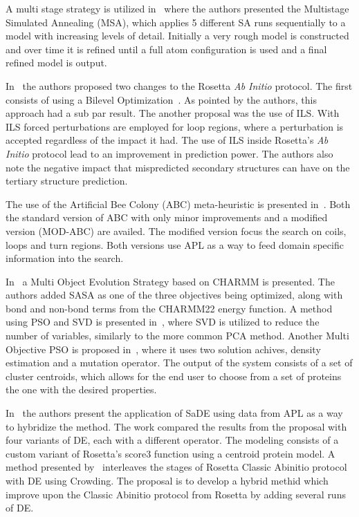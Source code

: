 A multi stage strategy is utilized in~\cite{silva2018multistage} where the authors
presented the Multistage Simulated Annealing (MSA), which applies 5 different
SA runs sequentially to a model with increasing levels of detail. Initially a
very rough model is constructed and over time it is refined until a full atom
configuration is used and a final refined model is output.

In~\cite{kandathil2018improved} the authors proposed two changes to the Rosetta
\textit{Ab Initio} protocol. The first consists of using a Bilevel
Optimization~\cite{sinha2018review}. As pointed by the authors, this approach had
a sub par result. The another proposal was the use of \ac{ILS}. With ILS forced
perturbations are employed for loop regions, where a perturbation is accepted
regardless of the impact it had. The use of \ac{ILS} inside Rosetta's
\textit{Ab Initio} protocol lead to an improvement in prediction power.
The authors also note the negative impact that mispredicted secondary structures
can have on the tertiary structure prediction.

The use of the Artificial Bee Colony (ABC) meta-heuristic is presented
in~\cite{correa2018knowledge}. Both the standard version of ABC with only
minor improvements and a modified version (MOD-ABC) are availed.
The modified version focus the search on coils, loops and turn regions. Both versions
use \ac{APL} as a way to feed domain specific information into the search.

In~\cite{gao2018incorporation} a Multi Object Evolution Strategy based on
CHARMM is presented. The authors added \ac{SASA} as one of the three objectives
being optimized, along with bond and non-bond terms from the CHARMM22 energy
function. A method using \ac{PSO} and \ac{SVD} is presented in~\cite{alvarez2018protein},
where \ac{SVD} is utilized to reduce the number of variables, similarly to the
more common \ac{PCA} method. Another Multi Objective \ac{PSO} is proposed
in~\cite{song2018adoption}, where it uses two solution achives, density estimation
and a mutation operator. The output of the system consists of a set of cluster
centroids, which allows for the end user to choose from a set of proteins the
one with the desired properties.

In~\cite{narloch2019knowledge} the authors present the application of \ac{SaDE}
using data from \ac{APL} as a way to hybridize the method. The work compared the
results from the proposal with four variants of \ac{DE}, each with a different
operator. The modeling consists of a custom variant of Rosetta's score3 function
using a centroid protein model. A method presented by~\cite{varela2019crowding}
interleaves the stages of Rosetta Classic Abinitio protocol with \ac{DE} using
Crowding. The proposal is to develop a hybrid methid which improve upon the
Classic Abinitio protocol from Rosetta by adding several runs of \ac{DE}.

